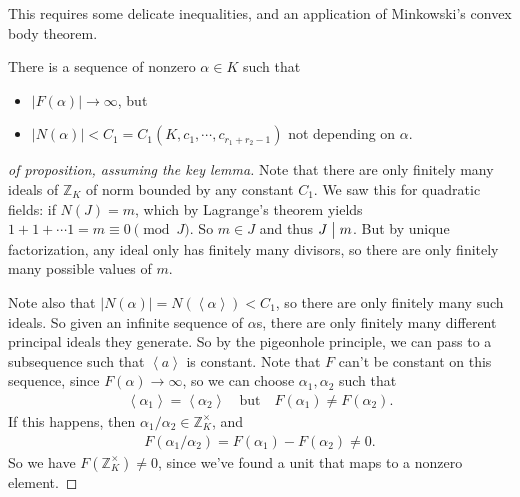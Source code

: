 \begin{remark}

This requires some delicate inequalities, and an application of
Minkowski's convex body theorem.

\end{remark}

\begin{lemma}

There is a sequence of nonzero \(\alpha\in K\) such that

\begin{itemize}
\tightlist
\item
  \({\left\lvert {F(\alpha)} \right\rvert} \to \infty\), but
\item
  \({\left\lvert {N( \alpha)} \right\rvert} < C_1 = C_1(K, c_1, \cdots, c_{r_1 + r_2 - 1} )\)
  not depending on \(\alpha\).
\end{itemize}

\end{lemma}

\begin{proof}[of proposition, assuming the key lemma]

Note that there are only finitely many ideals of \({\mathbb{Z}}_K\) of
norm bounded by any constant \(C_1\). We saw this for quadratic fields:
if \(N(J) = m\), which by Lagrange's theorem yields
\(1+1+\cdots 1 = m \equiv 0 \pmod J\). So \(m\in J\) and thus
\(J\bigm|m\). But by unique factorization, any ideal only has finitely
many divisors, so there are only finitely many possible values of \(m\).

Note also that
\({\left\lvert {N( \alpha )} \right\rvert} = N(\left\langle{ \alpha }\right\rangle ) < C_1\),
so there are only finitely many such ideals. So given an infinite
sequence of \(\alpha\)s, there are only finitely many different
principal ideals they generate. So by the pigeonhole principle, we can
pass to a subsequence such that \(\left\langle{ a }\right\rangle\) is
constant. Note that \(F\) can't be constant on this sequence, since
\(F(\alpha) \to \infty\), so we can choose \(\alpha_1, \alpha_2\) such
that
\begin{align*}
\left\langle{ \alpha_1 }\right\rangle= \left\langle{ \alpha_2 }\right\rangle \quad\text{but}\quad F(\alpha_1) \neq F(\alpha_2)  
.\end{align*}
If this happens, then
\(\alpha_1/ \alpha_2 \in {\mathbb{Z}}_K^{\times}\), and
\begin{align*}
F(\alpha_1/ \alpha_2) = F( \alpha_1)- F(\alpha_2) \neq 0
.\end{align*}
So we have \(F({\mathbb{Z}}_K^{\times})\neq 0\), since we've found a
unit that maps to a nonzero element.

\end{proof}

